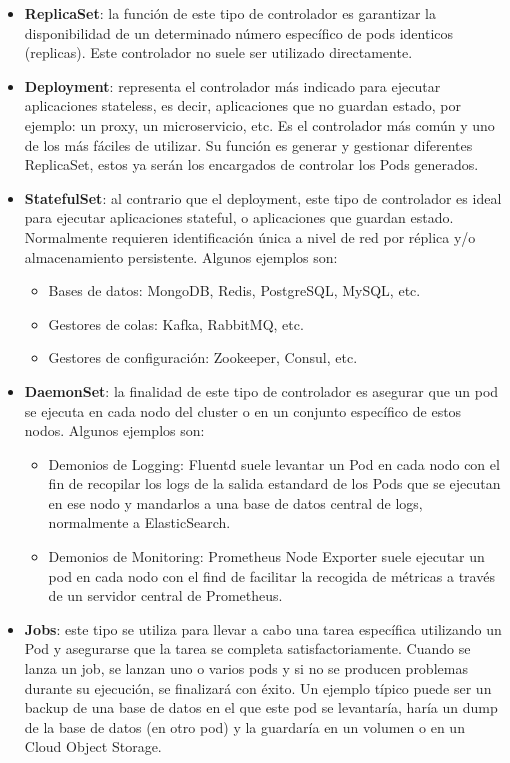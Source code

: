 \documentclass[spanish,twoside,12pt,a4paper]{book}
\begin{document}
\begin{itemize}
	\item \textbf{ReplicaSet}: la función de este tipo de controlador es garantizar la disponibilidad de un determinado número específico de pods identicos (replicas). Este controlador no suele ser utilizado directamente.
	\item \textbf{Deployment}: representa el controlador más indicado para ejecutar aplicaciones stateless, es decir, aplicaciones que no guardan estado, por ejemplo: un proxy, un microservicio, etc. Es el controlador más común y uno de los más fáciles de utilizar. Su función es generar y gestionar diferentes ReplicaSet, estos ya serán los encargados de controlar los Pods generados.
	\item \textbf{StatefulSet}: al contrario que el deployment, este tipo de controlador es ideal para ejecutar aplicaciones stateful, o aplicaciones que guardan estado. Normalmente requieren identificación única a nivel de red por réplica y/o almacenamiento persistente. Algunos ejemplos son:
	\begin{itemize}
	    \item Bases de datos: MongoDB, Redis, PostgreSQL, MySQL, etc. 
	    \item Gestores de colas: Kafka, RabbitMQ, etc.
	    \item Gestores de configuración: Zookeeper, Consul, etc.
	\end{itemize}
	\item \textbf{DaemonSet}: la finalidad de este tipo de controlador es asegurar que un pod se ejecuta en cada nodo del cluster o en un conjunto específico de estos nodos. Algunos ejemplos son:
	\begin{itemize}
	    \item Demonios de Logging: Fluentd suele levantar un Pod en cada nodo con el fin de recopilar los logs de la salida estandard de los Pods que se ejecutan en ese nodo y mandarlos a una base de datos central de logs, normalmente a ElasticSearch.
	    \item Demonios de Monitoring: Prometheus Node Exporter suele ejecutar un pod en cada nodo con el find de facilitar la recogida de métricas a través de un servidor central de Prometheus.
	\end{itemize}
	\item \textbf{Jobs}: este tipo se utiliza para llevar a cabo una tarea específica utilizando un Pod y asegurarse que la tarea se completa satisfactoriamente. Cuando se lanza un job, se lanzan uno o varios pods   y si no se producen problemas durante su ejecución, se finalizará con éxito. Un ejemplo típico puede ser un backup de una base de datos en el que este pod se levantaría, haría un dump de la base de datos (en otro pod) y la guardaría en un volumen o en un Cloud Object Storage.

\end{itemize}
\end{document}
